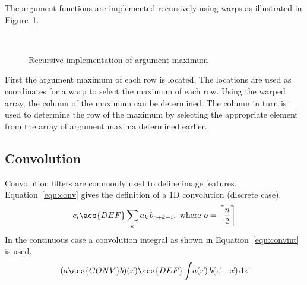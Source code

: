 \documentclass[12pt,a4paper,oneside,openright]{book}
\newcommand{\equ}[1]{Equation~\ref{equ:#1}}
\newcommand{\fig}[1]{Figure~\ref{fig:#1}}
\begin{document}
\begin{CJK}{UTF8}{}
The argument functions are implemented recursively using warps as illustrated in \fig{argmax}.
\begin{figure}[htbp]
   \begin{center}
     \\
     \caption{Recursive implementation of argument maximum\label{fig:argmax}}
   \end{center}
\end{figure}
First the argument maximum of each row is located. The locations are used as coordinates for a warp to select the maximum of each row. Using the warped array, the column of the maximum can be determined. The column in turn is used to determine the row of the maximum by selecting the appropriate element from the array of argument maxima determined earlier.

\subsection{Convolution}\label{cha:convolutions}
Convolution filters are commonly used to define image features. \equ{conv} gives the definition of a \ac{1D} convolution (discrete case).
\begin{equation}\label{equ:conv}
  c_i\acs{DEF}\displaystyle\sum_{k}a_{k}\,b_{o+k-i}\mathrm{,\ where\ }o=\bigg\lceil\frac{n}{2}\bigg\rceil
\end{equation}
In the continuous case a convolution integral as shown in \equ{convint} is used.
\begin{equation}\label{equ:convint}
  (a\acs{CONV}b)(\vec{x})\acs{DEF}\int\! a(\vec{x})\,b(\vec{z}-\vec{x})\,\mathrm{d}\vec{z}
\end{equation}


\end{CJK}
\end{document}
